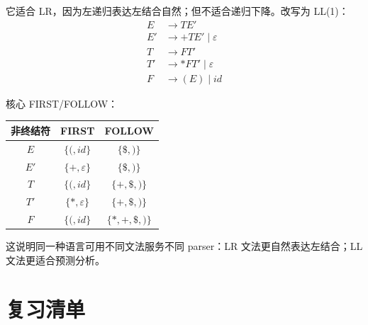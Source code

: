 \documentclass[UTF8,fontset=none,11pt]{ctexart}
\newcommand{\eps}{\varepsilon}
\begin{document}
它适合 LR，因为左递归表达左结合自然；但不适合递归下降。改写为 LL(1)：
\[
\begin{aligned}
E&\to TE'\\
E'&\to +TE'\mid\eps\\
T&\to FT'\\
T'&\to *FT'\mid\eps\\
F&\to (E)\mid id
\end{aligned}
\]

\begin{center}
\end{center}

核心 FIRST/FOLLOW：

\begin{center}
\begin{tabular}{c|c|c}
\toprule
非终结符 & FIRST & FOLLOW \\
\midrule
\(E\) & \(\{(,id\}\) & \(\{\$,)\}\) \\
\(E'\) & \(\{+,\eps\}\) & \(\{\$,)\}\) \\
\(T\) & \(\{(,id\}\) & \(\{+, \$, )\}\) \\
\(T'\) & \(\{*,\eps\}\) & \(\{+, \$, )\}\) \\
\(F\) & \(\{(,id\}\) & \(\{*, +, \$, )\}\) \\
\bottomrule
\end{tabular}
\end{center}

这说明同一种语言可用不同文法服务不同 parser：LR 文法更自然表达左结合；LL 文法更适合预测分析。

\section{复习清单}
\end{document}

